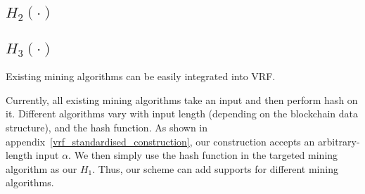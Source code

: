 \subsection{$H_{2}(\cdot)$}

\subsection{$H_{3}(\cdot)$}



Existing mining algorithms can be easily integrated into VRF.

Currently, all existing mining algorithms take an input and then perform hash on it. Different algorithms vary with input length (depending on the blockchain data structure), and the hash function.
As shown in appendix~\ref{vrf_standardised_construction}, our construction accepts an arbitrary-length input $\alpha$.
We then simply use the hash function in the targeted mining algorithm as our $H_{1}$.
Thus, our scheme can add supports for different mining algorithms.

